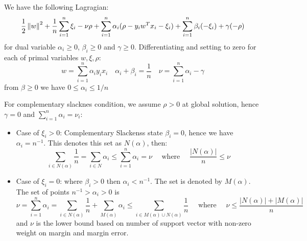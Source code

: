 \begin{remark}
    We have the following Lagragian:
    \begin{equation*}
        \frac{1}{2}\left\lVert w\right\rVert^2 + \frac{1}{n}\sum^n_{i=1}\xi_i - \nu\rho + \sum^n_{i=1}\alpha_i(\rho-y_iw^Tx_i - \xi_i) + \sum^n_{i=1}\beta_i(-\xi_i) + \gamma(-\rho)
    \end{equation*}
    for dual variable $\alpha_i\ge0$, $\beta_i\ge0$ and $\gamma\ge0$. Differentiating and setting to zero for each of primal variables $w, \xi, \rho$:
    \begin{equation*}
        w = \sum^n_{i=1}\alpha_iy_ix_i \quad \alpha_i+\beta_i=\frac{1}{n} \quad \nu = \sum^n_{i=1} \alpha_i-\gamma
    \end{equation*}
    from $\beta\ge0$ we have $0\le\alpha_i\le1/n$
\end{remark}

\begin{remark}
    For complementary slacknes condition, we assume $\rho>0$ at global solution, hence $\gamma=0$ and $\sum^n_{i=1}\alpha_i=\nu_i$:
    \begin{itemize}
        \item Case of $\xi_i>0$: Complementary Slackenss state $\beta_i=0$, hence we have $\alpha_i=n^{-1}$. This denotes this set as $N(\alpha)$, then:
        \begin{equation*}
            \sum_{i\in N(\alpha)}\frac{1}{n} = \sum_{i\in N}\alpha_i \le \sum^n_{i=1}\alpha_i = \nu \quad \text{ where } \quad \frac{|N(\alpha)|}{n}\le\nu
        \end{equation*}
        \item Case of $\xi_i = 0$: where $\beta_i>0$ then $\alpha_i<n^{-1}$. The set is denoted by $M(\alpha)$. The set of points $n^{-1}>\alpha_i>0$ is
        \begin{equation*}
            \nu = \sum^n_{i=1}\alpha_i = \sum_{i\in N(\alpha)}\frac{1}{n} + \sum_{M(\alpha)}\alpha_i \le \sum_{i\in M(\alpha)\cup N(\alpha)}\frac{1}{n} \quad \text{ where } \quad \nu\le\frac{|N(\alpha)| + |M(\alpha)|}{n}
        \end{equation*}
        and $\nu$ is the lower bound based on number of support vector with non-zero weight on margin and margin error.
    \end{itemize}
\end{remark}

